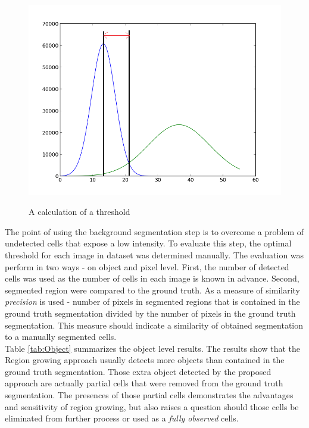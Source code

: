 \begin{figure}
	\begin{center}
		\includegraphics[scale=0.4]{Figures/segmentation/approx_hist_thr}
		\label{img:Thr}
		\caption{A calculation of a threshold}
	\end{center}
\end{figure}

The point of using the background segmentation step is to overcome a problem of undetected cells that expose a low intensity. To evaluate this step, the optimal threshold for each image in dataset was determined manually. The evaluation was perform in two ways - on object and pixel level. First, the number of detected cells was used as the number of cells in each image is known in advance. Second, segmented region were compared to the ground truth. As a measure of similarity \textit{precision} is used - number of pixels in segmented regions that is contained in the ground truth segmentation divided by the number of pixels in the ground truth segmentation. This measure should indicate a similarity of obtained segmentation to a manually segmented cells. \\

Table \ref{tab:Object} summarizes the object level results. The results show that the Region growing approach usually detects more objects than contained in the ground truth segmentation. Those extra object detected by the proposed approach are actually partial cells that were removed from the ground truth segmentation. The presences of those partial cells demonstrates the advantages and sensitivity of region growing, but also raises a question should those cells be eliminated from further process or used as a \textit{fully observed} cells.


